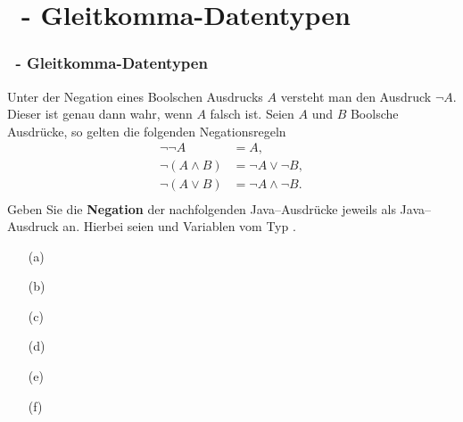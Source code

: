 \def\stitle{\theexercise\ - Gleitkomma-Datentypen}
\section{\stitle}
\begin{frame}[t]%
  \frametitle{\stitle}
\medskip

Unter der Negation eines Boolschen Ausdrucks $A$ versteht man den Ausdruck $\neg A$. Dieser ist genau dann wahr, wenn $A$ falsch ist. Seien $A$ und $B$ Boolsche Ausdrücke, so gelten die folgenden Negationsregeln
\begin{align*}
\neg \neg A &= A,\\
\neg (A \wedge B) &= \neg A \vee \neg B,\\
\neg (A \vee B)   &= \neg A \wedge \neg B. \\
\end{align*}
Geben Sie die \textbf{Negation} der nachfolgenden Java--Ausdrücke jeweils als Java--Ausdruck an. Hierbei seien  und  Variablen vom Typ .\\[1em]
\begin{center}
\begin{minipage}{0.35\textwidth}
\begin{itemize}
\item[(a)] 
\item[(b)] 
\item[(c)] 
\end{itemize}
\end{minipage}
\quad
\begin{minipage}{0.6\textwidth}
\begin{itemize}
\item[(d)] 
\item[(e)] 
\item[(f)] 
\end{itemize}
\end{minipage}
\end{center}

\end{frame}
